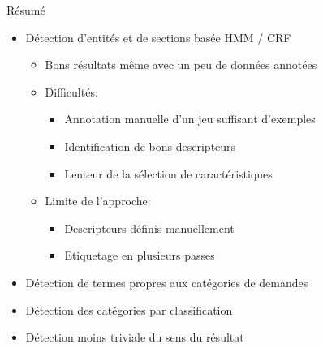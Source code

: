 \documentclass[newPxFont,pagenumber]{beamer}
\begin{document}
\begin{frame}{Résumé}
\begin{itemize}
\item Détection d'entités et de sections basée HMM / CRF
\begin{itemize}
\item Bons résultats même avec un peu de données annotées
\item Difficultés:
\begin{itemize}
\item Annotation manuelle d'un jeu suffisant d'exemples
\item Identification de bons descripteurs 
\item Lenteur de la sélection de caractéristiques
\end{itemize}
\item Limite de l'approche:
\begin{itemize}
\item Descripteurs définis manuellement 
\item Etiquetage en plusieurs passes 
\end{itemize}
\end{itemize}
\item Détection de termes propres aux catégories de demandes
\item Détection des catégories par classification
\item Détection moins triviale du sens du résultat 
\end{itemize}

\end{frame}

%
%
\end{document}
